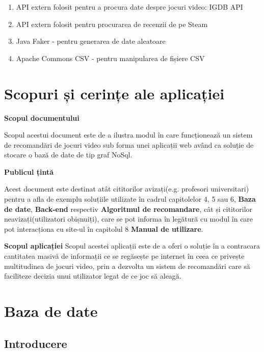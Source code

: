 \documentclass[12pt,a4paper]{report}
\begin{document}
\begin{enumerate}
  \item API extern folosit pentru a procura date despre jocuri video: IGDB API \cite{1}
  \item API extern folosit pentru procurarea de recenzii de pe Steam \cite{2}
  \item Java Faker - pentru generarea de date aleatoare \cite{3}
  \item Apache Commons CSV - pentru manipularea de fișiere CSV \cite{4}
\end{enumerate}


\section{Scopuri și cerințe ale aplicației}

\bigskip
\textbf{Scopul documentului}
\bigskip

Scopul acestui document este de a ilustra modul în care funcționează un sistem de recomandări de jocuri video sub forma unei aplicații web având ca soluție de stocare o bază de date de tip graf NoSql.

\bigskip
\bigskip
\bigskip
\bigskip
\textbf{Publicul țintă}
\bigskip

Acest document este destinat atât cititorilor avizați(e.g. profesori universitari) pentru a afla de exemplu soluțiile utilizate în cadrul capitolelor 4, 5 sau 6, \textbf{Baza de date}, \textbf{Back-end} respectiv \textbf{Algoritmul de recomandare}, cât și cititorilor neavizați(utilizatori obișnuiți), care se pot informa în legătură cu modul în care pot interacționa cu site-ul în capitolul 8 \textbf{Manual de utilizare}.

\bigskip
\textbf{Scopul aplicației}
\bigskip
Scopul acestei aplicații este de a oferi o soluție în a contracara cantitatea masivă de informații ce se regăsește pe internet \cite{5} în ceea ce privește multitudinea de jocuri video, prin a dezvolta un sistem de recomandări care să faciliteze decizia unui utilizator legat de ce joc să aleagă.  




\section{Baza de date}
\subsection{Introducere}
\end{document}
